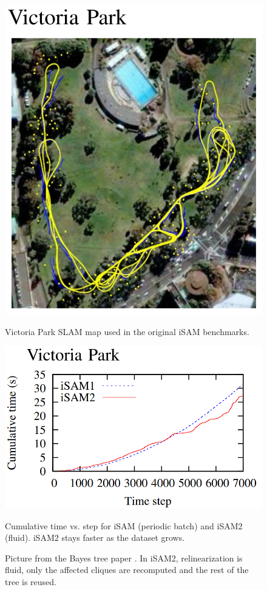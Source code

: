 \begin{figure}[H]
  \centering
  \begin{minipage}[t]{0.35\linewidth}
    \centering
    \includegraphics[width=\linewidth]{Pictures/Optimizers/iSAM2/Victoria_park_map.png}
    \caption*{\small Victoria Park \gls{SLAM} map used in the original \gls{iSAM} benchmarks.}
  \end{minipage}\hfill
  \begin{minipage}[t]{0.55\linewidth}
    \centering
    \includegraphics[width=\linewidth]{Pictures/Optimizers/iSAM2/Victoria_park_graph.png}
    \caption*{\small Cumulative time vs. step for \gls{iSAM} (periodic batch) and \gls{iSAM}2 (fluid). \gls{iSAM}2 stays faster as the dataset grows.}
  \end{minipage}
  \caption{Picture from the Bayes tree paper \cite{Bayes_tree_for_SLAM_paper}. In \gls{iSAM}2, relinearization is fluid, only the affected cliques are recomputed and the rest of the tree is reused.}
  \label{fig:optimizer-iSAM2-fluid-relin}
\end{figure}
